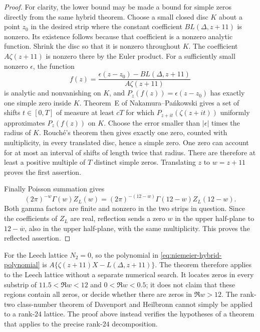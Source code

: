 \begin{proof}
For clarity, the lower bound may be made a bound for simple zeros directly
from the same hybrid theorem.  Choose a small closed disc $K$ about a point
$z_0$ in the desired strip where the constant coefficient
$B L(\Delta,z+11)$ is nonzero.  Its existence follows because that
coefficient is a nonzero analytic function.  Shrink the disc so that it is
nonzero throughout $K$.  The coefficient $A\zeta(z+11)$ is nonzero there
by the Euler product.  For a sufficiently small nonzero $\epsilon$, the
function
\[
 f(z)=\frac{\epsilon(z-z_0)-B L(\Delta,z+11)}{A\zeta(z+11)}
\]
is analytic and nonvanishing on $K$, and
$P_z(f(z))=\epsilon(z-z_0)$ has exactly one simple zero inside $K$.
Theorem~E of Nakamura--Pa\'nkowski \cite[arXiv v4, p.~5]{NP2016} gives a
set of shifts $t\in[0,T]$ of measure at least $cT$ for which
$P_{z+it}(\zeta(z+it))$ uniformly approximates $P_z(f(z))$ on $K$.
Choose the error smaller than $|\epsilon|$ times the radius of $K$.
Rouch\'e's theorem then gives exactly one zero, counted with multiplicity,
in every translated disc, hence a simple zero.  One zero can account for
at most an interval of shifts of length twice that radius.  There are
therefore at least a positive multiple of $T$ distinct simple zeros.
Translating $z$ to $w=z+11$ proves the first assertion.

Finally Poisson summation gives
\[
 (2\pi)^{-w}\Gamma(w)Z_L(w)
  =(2\pi)^{-(12-w)}\Gamma(12-w)Z_L(12-w).
\]
Both gamma factors are finite and nonzero in the two strips in question.
Since the coefficients of $Z_L$ are real, reflection sends a zero $w$ in
the upper half-plane to $12-\overline w$, also in the upper half-plane,
with the same multiplicity.  This proves the reflected assertion.
\end{proof}

For the Leech lattice $N_2=0$, so the polynomial in
\eqref{eq:niemeier-hybrid-polynomial} is
$A\{\zeta(z+11)X-L(\Delta,z+11)\}$.
The theorem therefore applies to the Leech lattice without a separate
numerical search.  It locates zeros in every substrip of
$11.5<\Re w<12$ and $0<\Re w<0.5$; it does not claim that these regions
contain all zeros, or decide whether there are zeros in $\Re w>12$.
The rank-two class-number theorem of Davenport and Heilbronn cannot simply
be applied to a rank-$24$ lattice.  The proof above instead verifies the
hypotheses of a theorem that applies to the precise rank-$24$ decomposition.
